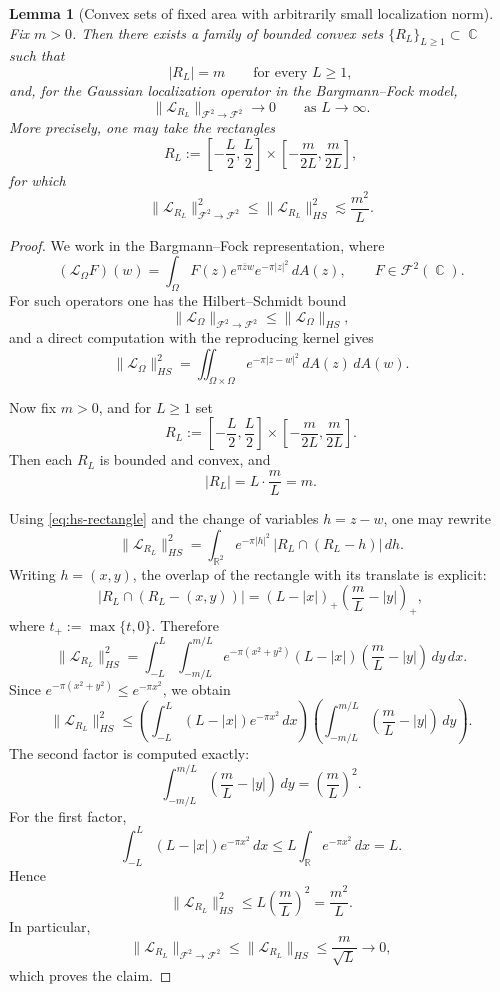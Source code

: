 \documentclass[a4paper,11pt,reqno]{amsart}
\newtheorem{lemma}{Lemma}[section]
\DeclareMathOperator{\C}{\mathbb{C}}
\DeclareMathOperator{\R}{\mathbb{R}}
\begin{document}
\begin{lemma}[Convex sets of fixed area with arbitrarily small localization norm]
Fix \(m>0\). Then there exists a family of bounded convex sets
\(\{R_L\}_{L\geq 1}\subset \C\) such that
\[
|R_L|=m
\qquad\text{for every }L\geq 1,
\]
and, for the Gaussian localization operator in the Bargmann--Fock model,
\[
\|\mathcal L_{R_L}\|_{\mathcal F^2\to \mathcal F^2}\to 0
\qquad\text{as }L\to\infty.
\]
More precisely, one may take the rectangles
\[
R_L:=
\left[-\frac L2,\frac L2\right]\times
\left[-\frac{m}{2L},\frac{m}{2L}\right],
\]
for which
\[
\|\mathcal L_{R_L}\|_{\mathcal F^2\to \mathcal F^2}^2
\leq
\|\mathcal L_{R_L}\|_{HS}^2
\lesssim
\frac{m^2}{L}.
\]
\end{lemma}

\begin{proof}
We work in the Bargmann--Fock representation, where
\[
(\mathcal L_\Omega F)(w)
=
\int_\Omega F(z)e^{\pi \overline zw}e^{-\pi |z|^2}\,dA(z),
\qquad F\in \mathcal F^2(\C).
\]
For such operators one has the Hilbert--Schmidt bound
\[
\|\mathcal L_\Omega\|_{\mathcal F^2\to \mathcal F^2}
\leq
\|\mathcal L_\Omega\|_{HS},
\]
and a direct computation with the reproducing kernel gives
\begin{equation}\label{eq:hs-rectangle}
\|\mathcal L_\Omega\|_{HS}^2
=
\iint_{\Omega\times\Omega} e^{-\pi |z-w|^2}\,dA(z)\,dA(w).
\end{equation}

Now fix \(m>0\), and for \(L\geq 1\) set
\[
R_L:=
\left[-\frac L2,\frac L2\right]\times
\left[-\frac{m}{2L},\frac{m}{2L}\right].
\]
Then each \(R_L\) is bounded and convex, and
\[
|R_L|=L\cdot \frac{m}{L}=m.
\]

Using \eqref{eq:hs-rectangle} and the change of variables \(h=z-w\), one may rewrite
\[
\|\mathcal L_{R_L}\|_{HS}^2
=
\int_{\R^2} e^{-\pi |h|^2}\,|R_L\cap (R_L-h)|\,dh.
\]
Writing \(h=(x,y)\), the overlap of the rectangle with its translate is explicit:
\[
|R_L\cap (R_L-(x,y))|
=
(L-|x|)_+\left(\frac{m}{L}-|y|\right)_+,
\]
where \(t_+:=\max\{t,0\}\). Therefore
\[
\|\mathcal L_{R_L}\|_{HS}^2
=
\int_{-L}^{L}\int_{-m/L}^{m/L}
e^{-\pi(x^2+y^2)}
(L-|x|)\left(\frac{m}{L}-|y|\right)\,dy\,dx.
\]
Since \(e^{-\pi(x^2+y^2)}\le e^{-\pi x^2}\), we obtain
\[
\|\mathcal L_{R_L}\|_{HS}^2
\le
\left(\int_{-L}^{L} (L-|x|)e^{-\pi x^2}\,dx\right)
\left(\int_{-m/L}^{m/L}\left(\frac{m}{L}-|y|\right)\,dy\right).
\]
The second factor is computed exactly:
\[
\int_{-m/L}^{m/L}\left(\frac{m}{L}-|y|\right)\,dy
=
\left(\frac{m}{L}\right)^2.
\]
For the first factor,
\[
\int_{-L}^{L} (L-|x|)e^{-\pi x^2}\,dx
\le
L\int_{\R} e^{-\pi x^2}\,dx
=
L.
\]
Hence
\[
\|\mathcal L_{R_L}\|_{HS}^2
\le
L\left(\frac{m}{L}\right)^2
=
\frac{m^2}{L}.
\]
In particular,
\[
\|\mathcal L_{R_L}\|_{\mathcal F^2\to \mathcal F^2}
\le
\|\mathcal L_{R_L}\|_{HS}
\le
\frac{m}{\sqrt L}
\to 0,
\]
which proves the claim.
\end{proof}
\end{document}
